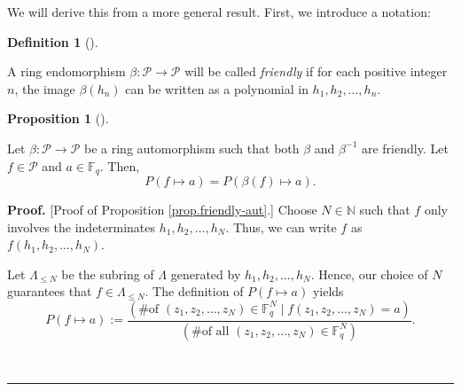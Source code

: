 \documentclass[numbers=enddot,12pt,final,onecolumn,notitlepage]{scrartcl}%
\theoremstyle{definition}
\newtheorem{prop}[theo]{Proposition}
\newenvironment{proposition}[1][]
{\begin{prop}[#1]\begin{leftbar}}
{\end{leftbar}\end{prop}}
\newtheorem{defi}[theo]{Definition}
\newenvironment{definition}[1][]
{\begin{defi}[#1]\begin{leftbar}}
{\end{leftbar}\end{defi}}
\newenvironment{proof}[1][Proof]{\noindent\textbf{#1.} }{\ \rule{0.5em}{0.5em}}
\newenvironment{verlong}{}{}
\newcommand{\Fq}{\mathbb{F}_q}
\renewcommand{\leq}{\leqslant}
\theoremstyle{plainsl}
\begin{document}
\begin{verlong}
We will derive this from a more general result. First, we introduce a notation:

\begin{definition}
A ring endomorphism $\beta:\mathcal{P}\rightarrow\mathcal{P}$ will be called
\emph{friendly} if for each positive integer $n$, the image $\beta\left(
h_{n}\right)  $ can be written as a polynomial in $h_{1},h_{2},\ldots,h_{n}$.
\end{definition}

\begin{proposition}
\label{prop.friendly-aut}Let $\beta:\mathcal{P}\rightarrow\mathcal{P}$ be a
ring automorphism such that both $\beta$ and $\beta^{-1}$ are friendly. Let
$f\in\mathcal{P}$ and $a\in\Fq$. Then,%
\[
P\left(  f\mapsto a\right)  =P\left(  \beta\left(  f\right)  \mapsto a\right)
.
\]

\end{proposition}

\begin{proof}
[Proof of Proposition \ref{prop.friendly-aut}.] Choose $N\in\mathbb{N}$ such
that $f$ only involves the indeterminates $h_{1},h_{2},\ldots,h_{N}$. Thus, we
can write $f$ as $f\left(  h_{1},h_{2},\ldots,h_{N}\right)  $.

Let $\Lambda_{\leq N}$ be the subring of $\Lambda$ generated by $h_{1}%
,h_{2},\ldots,h_{N}$. Hence, our choice of $N$ guarantees that $f\in
\Lambda_{\leq N}$. The definition of $P\left(  f\mapsto a\right)  $ yields%
\begin{equation}
P\left(  f\mapsto a\right)  :=\dfrac{\left(  \text{\# of }\left(  z_{1}%
,z_{2},\ldots,z_{N}\right)  \in\Fq^{N}\mid f\left(  z_{1}%
,z_{2},\ldots,z_{N}\right)  =a\right)  }{\left(  \text{\# of all }\left(
z_{1},z_{2},\ldots,z_{N}\right)  \in\Fq^{N}\right)  }%
.\label{pf.prop.friendly-aut.P1}%
\end{equation}



\end{proof}
\end{verlong}
\end{document}
